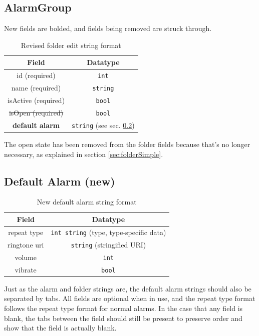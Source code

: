 \documentclass[11pt]{article} %
\begin{document}
\subsection{AlarmGroup}
\label{sec:folderChanges}
New fields are bolded, and fields being removed are struck through.
\begin{table}[h]
	\centering
	\begin{tabular}{c|c}
		Field & Datatype \\ \hline
		id (required) & \verb|int| \\
		name (required) & \verb|string| \\
		isActive (required) & \verb|bool| \\
		\sout{isOpen (required)} & \verb|bool| \\
		\textbf{default alarm} & \verb|string| (see sec. \ref{sec:defAlarmString}) \\
	\end{tabular}
	\caption{Revised folder edit string format}
\end{table}

The open state has been removed from the folder fields because that's no longer necessary, as explained in section \ref{sec:folderSimple}. 

\subsection{Default Alarm (new)}
\label{sec:defAlarmString}
\begin{table}[h]
	\centering
	\begin{tabular}{c|c}
		Field & Datatype \\ \hline
		repeat type & \verb|int string| (type, type-specific data) \\
		ringtone uri & \verb|string| (stringified URI) \\
		volume & \verb|int| \\
		vibrate & \verb|bool| \\
	\end{tabular}
	\caption{New default alarm string format}
\end{table}

Just as the alarm and folder strings are, the default alarm strings should also be separated by tabs. All fields are optional when in use, and the repeat type format follows the repeat type format for normal alarms. In the case that any field is blank, the tabs between the field should still be present to preserve order and show that the field is actually blank.
\end{document}
